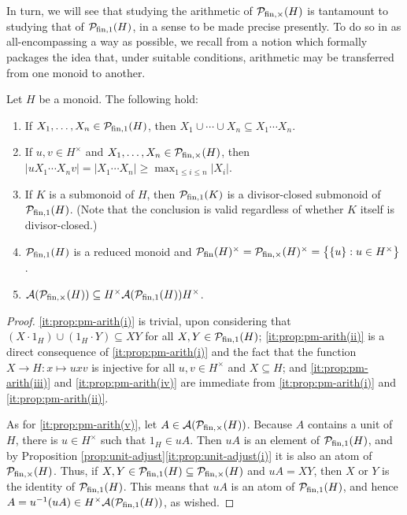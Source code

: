 In turn, we will see that studying the arithmetic of $\mathcal{P}_{\textrm{fin}, \times}(H)$ is tantamount to studying that of $\mathcal{P}_{\textrm{fin}, 1}(H)$, in a sense to be made precise presently.
To do so in as all-encompassing a way as possible, we recall from \cite[Definition 3.2]{tringali18} a notion which formally packages the idea that, under suitable conditions, arithmetic may be transferred from one monoid to another.
\begin{prop}\label{prop:pm-arith}
	Let $H$ be a monoid. The following hold:
	\begin{enumerate}[label={\rm (\roman{*})}]
		\item\label{it:prop:pm-arith(i)} If $X_1,\ldots,X_n\in \mathcal{P}_{\textrm{fin},1}(H)$, then $X_1 \cup \cdots \cup X_n \subseteq X_1 \cdots X_n$.
		\item\label{it:prop:pm-arith(ii)} If $u,v \in H^\times$ and $X_1,\ldots,X_n\in \mathcal{P}_{\textrm{fin},\times}(H)$, then $|uX_1 \cdots X_nv| = |X_1 \cdots X_n| \ge \max_{1 \le i \le n} |X_i|$.
		\item\label{it:prop:pm-arith(iii)} If $K$ is a submonoid of $H$, then $\mathcal{P}_{\textrm{fin}, 1}(K)$ is a divisor-closed submonoid of $\mathcal{P}_{\textrm{fin}, 1}(H)$. \textup{(}Note that the conclusion is valid regardless of whether $K$ itself is divisor-closed.\textup{)}
		\item \label{it:prop:pm-arith(iv)} $\mathcal{P}_{\textrm{fin}, 1}(H)$ is a reduced monoid and $\mathcal{P}_{\textrm{fin}}(H)^\times=\mathcal{P}_{\textrm{fin}, \times}(H)^\times = \bigl\{ \{u\}: u\in H^\times\bigr\}$.
		\item \label{it:prop:pm-arith(v)} $\mathcal{A}(\mathcal P_{{\textrm{fin}, \times}}(H)) \subseteq H^\times \mathcal{A}(\mathcal P_{{\textrm{fin}, 1}}(H)) H^\times$.
	\end{enumerate}
\end{prop}
%
\begin{proof}
	\ref{it:prop:pm-arith(i)} is trivial, upon considering that $(X \cdot 1_H) \cup (1_H \cdot Y) \subseteq XY$ for all $X, Y \in \mathcal P_{\textrm{fin}, 1}(H)$; \ref{it:prop:pm-arith(ii)} is a direct consequence of \ref{it:prop:pm-arith(i)} and the fact that the function $X \to H: x \mapsto uxv$ is injective for all $u, v \in H^\times$ and $X \subseteq H$; and \ref{it:prop:pm-arith(iii)} and \ref{it:prop:pm-arith(iv)} are immediate from \ref{it:prop:pm-arith(i)} and \ref{it:prop:pm-arith(ii)}.
	
	As for \ref{it:prop:pm-arith(v)}, let $A\in \mathcal{A}(\mathcal{P}_{\textrm{fin}, \times}(H))$.
	Because $A$ contains a unit of $H$, there is $u\in H^\times$ such that $1_H \in uA$.
	Then $uA$ is an element of $\mathcal{P}_{\textrm{fin}, 1}(H)$, and by Proposition \ref{prop:unit-adjust}\ref{it:prop:unit-adjust(i)} it is also an atom of $\mathcal{P}_{\textrm{fin}, \times}(H)$.
	Thus, if $X,Y\in \mathcal{P}_{\textrm{fin}, 1}(H) \subseteq \mathcal{P}_{\textrm{fin}, \times}(H)$ and $uA = XY$, then $X$ or $Y$ is the identity of $\mathcal{P}_{\textrm{fin}, 1}(H)$.
	This means that $uA$ is an atom of $\mathcal{P}_{\textrm{fin}, 1}(H)$, and hence $A=u^{-1}(uA)\in H^\times \mathcal{A}(\mathcal{P}_{\textrm{fin}, 1}(H))$, as wished.
\end{proof}

